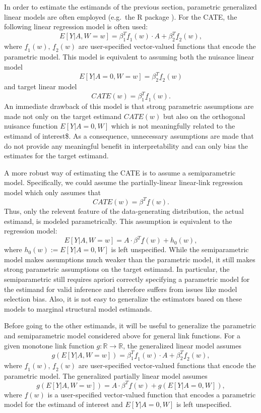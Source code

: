\documentclass[
]{jss}
\begin{document}
In order to estimate the estimands of the previous section, parametric
generalized linear models are often employed (e.g.~the R package
). For the CATE, the following linear regression model is often
used:
\[E[Y|A, W=w] =    \beta_1^T \underline{f}_1(w) \cdot A + \beta_2^T \underline{f}_2(w),\]
where \(\underline{f}_1(w),\, \underline{f}_2(w)\) are user-specified
vector-valued functions that encode the parametric model. This model is
equivalent to assuming both the nuisance linear model
\[E[Y|A=0,W=w] =  \beta_2^T \underline{f}_2(w) \] and target linear
model \[CATE(w) = \beta_1^T \underline{f}_1(w).\] An immediate drawback
of this model is that strong parametric assumptions are made not only on
the target estimand \(CATE(w)\) but also on the orthogonal nuisance
function \(E[Y|A=0,W]\) which is not meaningfully related to the
estimand of interest\$. As a consequence, unnecessary assumptions are
made that do not provide any meaningful benefit in interpretability and
can only bias the estimates for the target estimand.

A more robust way of estimating the CATE is to assume a semiparametric
model. Specifically, we could assume the partially-linear linear-link
regression model which only assumes that
\[CATE(w) = \beta^T \underline{f}(w).\] Thus, only the relevent feature
of the data-generating distribution, the actual estimand, is modeled
parametrically. This assumption is equivalent to the regression model:
\[E[Y|A,W=w] = A \cdot \beta^T \underline{f}(w) + h_0(w),\] where
\(h_0(w) := E[Y|A=0,W]\) is left unspecified. While the semiparametric
model makes assumptions much weaker than the parametric model, it still
makes strong parametric assumptions on the target estimand. In
particular, the semiparametric still requires apriori correctly
specifying a parametric model for the estimand for valid inference and
therefore suffers from issues like model selection bias. Also, it is not
easy to generalize the estimators based on these models to marginal
structural model estimands.

Before going to the other estimands, it will be useful to generalize the
parametric and semiparametric model considered above for general link
functions. For a given monotone link function
\(g: \mathbb{R} \rightarrow \mathbb{R}\), the generalized linear model
assumes
\[g(E[Y|A,W=w]) = \beta_1^T \underline{f}_1(w) \cdot A + \beta_2^T \underline{f}_2(w),\]
where \(\underline{f}_1(w),\, \underline{f}_2(w)\) are user-specified
vector-valued functions that encode the parametric model. The
generalized partially linear model assumes
\[g(E[Y|A,W=w]) = A \cdot \beta^T \underline{f}(w)  + g(E[Y|A=0,W]),\]
where \(\underline{f}(w)\) is a user-specified vector-valued function
that encodes a parametric model for the estimand of interest and
\(E[Y|A=0,W]\) is left unspecified.
\end{document}
